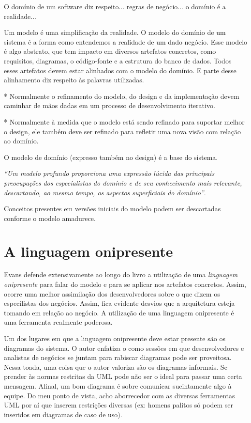 \documentclass[a4paper, 12pt]{article}
\newcommand{\citacao}[1]{\emph{``#1''}}
\begin{document}
O domínio de um software diz respeito... regras de negócio... o domínio é a realidade...

Um modelo é uma simplificação da realidade. O modelo do domínio de um sistema é a forma como entendemos a realidade de um dado negócio. Esse modelo é algo abstrato, que tem impacto em diversos artefatos concretos, como requisitos, diagramas, o código-fonte e a estrutura do banco de dados. Todos esses artefatos devem estar alinhados com o modelo do domínio. E parte desse alinhamento diz respeito às palavras utilizadas. 

* Normalmente o refinamento do modelo, do design e da implementação devem caminhar de mãos dadas em um processo de desenvolvimento iterativo.

* Normalmente à medida que o modelo está sendo refinado para suportar melhor o design, ele também deve ser refinado para refletir uma nova visão com relação ao domínio.

O modelo de domínio (expresso também no design) é a base do sistema.

\citacao{Um modelo profundo proporciona uma expressão lúcida das principais preocupações dos especialistas do domínio e de seu conhecimento mais relevante, descartando, ao mesmo tempo, os aspectos superficiais do domínio}.

Conceitos presentes em versões iniciais do modelo podem ser descartadas conforme o modelo amadurece.

\section{A linguagem onipresente}

Evans defende extensivamente ao longo do livro a utilização de uma \emph{linguagem onipresente} para falar do modelo e para se aplicar nos artefatos concretos. Assim, ocorre uma melhor assimilação dos desenvolvedores sobre o que dizem os especilistas dos negócios. Assim, fica evidente desvios que a arquitetura esteja tomando em relação ao negócio. A utilização de uma linguagem onipresente é uma ferramenta realmente poderosa.

Um dos lugares em que a linguagem onipresente deve estar presente são os diagramas do sistema. O autor enfatiza o como sessões em que desenvolvedores e analistas de negócios se juntam para rabiscar diagramas pode ser proveitosa. Nessa toada, uma coisa que o autor valoriza são os diagramas informais. Se prender às normas restritas da UML pode não ser o ideal para passar uma certa mensagem. Afinal, um bom diagrama é sobre comunicar sucintamente algo à equipe. Do meu ponto de vista, acho aborrecedor com as diversas ferramentas UML por aí que inserem restrições diversas (ex: homens palitos só podem ser inseridos em diagramas de caso de uso).
\end{document}
